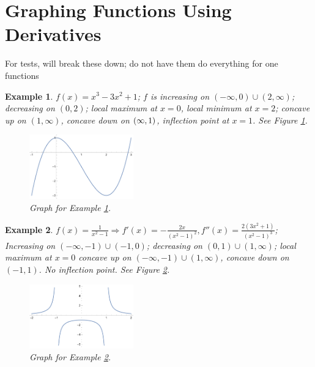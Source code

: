 \documentclass[letterpaper, 11pt, openany]{book}
\theoremstyle{mytheoremstyle}
\theoremstyle{myexamplestyle}
\newtheorem{example}{Example}[section]
\begin{document}
\section{Graphing Functions Using Derivatives}
For tests, will break these down; do not have them do everything for one functions

\begin{example}\label{e:graph-polynomial}
    \(f(x) = x^3 - 3x^2 + 1\); \(f\) is increasing on \((-\infty, 0)\cup (2,\infty) \); decreasing on \((0,2)\); local maximum at \(x = 0\), local minimum at \(x=2\); concave up on \((1, \infty)\), concave down on \((\-\infty, 1)\), inflection point at \(x = 1\). See Figure \ref{f:graph-polynomial}.
    \begin{figure}[htbp]
        \centering
            \includegraphics[width=0.4\textwidth]{Figures/graphing-polynomial.pdf}
        \caption{Graph for Example \ref{e:graph-polynomial}.}
        \label{f:graph-polynomial}
    \end{figure}
\end{example}

\begin{example}\label{e:graph-rational}
    \(\displaystyle f(x) = \frac{1}{x^2 - 1} \Rightarrow f'(x) = -\frac{2x}{(x^2 - 1)^2}, f''(x) = \frac{2 \left(3 x^2+1\right)}{\left(x^2-1\right)^3}\); Increasing on \((-\infty, -1)\cup (-1,0)\); decreasing on \((0,1)\cup(1,\infty)\); local maximum at \(x=0\) concave up on \((-\infty, -1) \cup (1, \infty)\), concave down on \((-1,1)\). No inflection point. See Figure \ref{f:graph-rational}.
    \begin{figure}[htbp]
        \centering
            \includegraphics[width=0.4\textwidth]{Figures/graphing-rational.pdf}
        \caption{Graph for Example \ref{e:graph-rational}.}
        \label{f:graph-rational}
    \end{figure}
\end{example}
\end{document}
